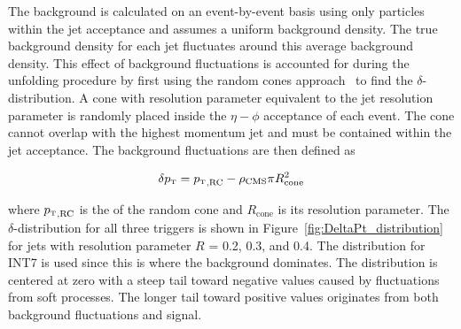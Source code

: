 \noindent
The background is calculated on an event-by-event basis using only particles within the jet acceptance and assumes a uniform background density. The true background density for each jet fluctuates around this average background density. This effect of background fluctuations is accounted for during the unfolding procedure by first using the random cones approach~\cite{ALICE:2012nbx} to find the $\delta$-\pT distribution. A cone with resolution parameter equivalent to the jet resolution parameter is randomly placed inside the $\eta-\phi$ acceptance of each event. The cone cannot overlap with the highest momentum jet and must be contained within the jet acceptance. The background fluctuations are then defined as 

\begin{equation}
    \delta \text{$p_{\mbox{\tiny T}}$} = \text{$p_{\mbox{\tiny T}}$}_\text{,RC} - \rho_{\text{CMS}} \pi R_{\text{cone}}^2
\end{equation}

\noindent
where $\text{$p_{\mbox{\tiny T}}$}_\text{,RC}$ is the \pT of the random cone and $R_{\text{cone}}$ is its resolution parameter. The $\delta$-\pT distribution for all three triggers is shown in Figure~\ref{fig:DeltaPt_distribution} for jets with resolution parameter $R$ = 0.2, 0.3, and 0.4. The distribution for INT7 is used since this is where the background dominates. The distribution is centered at zero with a steep tail toward negative values caused by fluctuations from soft processes. The longer tail toward positive values originates from both background fluctuations and signal.



